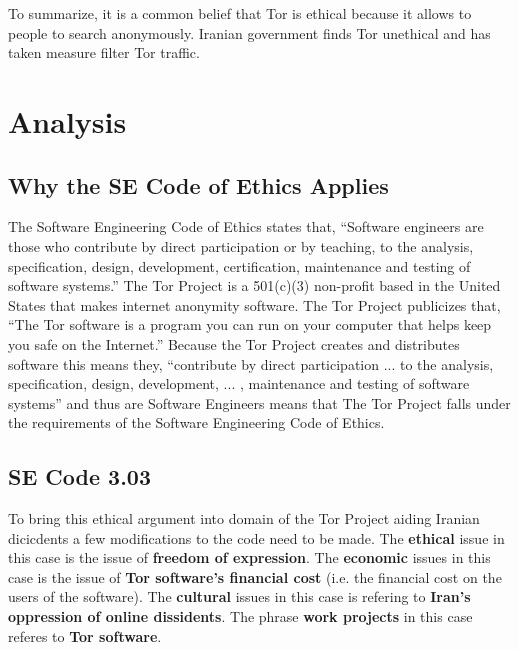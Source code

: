\documentclass[11pt]{article}
\begin{document}
\begin{multicols}{2}
To summarize, it is a common belief that Tor is ethical because it allows to
people to search anonymously. Iranian government finds Tor unethical and has
taken measure filter Tor traffic.




\section{Analysis}

\subsection{Why the SE Code of Ethics Applies} 

The Software Engineering Code of Ethics states that, ``Software engineers are
those who contribute by direct participation or by teaching, to the analysis,
specification, design, development, certification, maintenance and testing of
software systems.'' \cite{SE:CodeOfEthics} The Tor Project is a 501(c)(3)
non-profit based in the United States that makes internet anonymity
software.\cite{Tor:FAQ, Tor:CorePeople} The Tor Project publicizes that, ``The
Tor software is a program you can run on your computer that helps keep you safe
on the Internet.''\cite{Tor:FAQ} Because the Tor Project creates and distributes
software this means they, ``contribute by direct participation ...  to the
analysis, specification, design, development, ... , maintenance and testing of
software systems'' and thus are Software Engineers means that The Tor Project
falls under the requirements of the Software Engineering Code of
Ethics.\cite{Tor:FAQ, Tor:Overview} 


\subsection{SE Code 3.03}

\newline

To bring this ethical argument into domain of the Tor Project
aiding Iranian dicicdents a few modifications to the code need to be made. The
\textbf{ethical} issue in this case is the issue of \textbf{freedom of
expression}. The \textbf{economic} issues in this case is the issue of
\textbf{Tor software's financial cost} (i.e. the financial cost on the users of
the software). The \textbf{cultural} issues in this case is refering to
\textbf{Iran's oppression of online dissidents}. The phrase \textbf{work projects} in
this case referes to \textbf{Tor software}.


\end{multicols}
\end{document}
